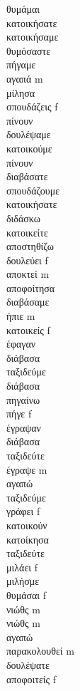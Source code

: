 θυμάμαι  \\ 
κατοικήσατε  \\ 
κατοικήσαμε  \\ 
θυμόσαστε  \\ 
πήγαμε  \\ 
αγαπά m \\ 
μίλησα  \\ 
σπουδάζεις f \\ 
πίνουν  \\ 
δουλέψαμε  \\ 
κατοικούμε  \\ 
πίνουν  \\ 
διαβάσατε  \\ 
σπουδάζουμε  \\ 
κατοικήσατε  \\ 
διδάσκω  \\ 
κατοικείτε  \\ 
αποστηθίζω  \\ 
δουλεύει f \\ 
αποκτεί m \\ 
αποφοίτησα  \\ 
διαβάσαμε  \\ 
ήπιε m \\ 
κατοικείς f \\ 
έφαγαν  \\ 
διάβασα  \\ 
ταξιδεύμε  \\ 
διάβασα  \\ 
πηγαίνω  \\ 
πήγε f \\ 
έγραψαν  \\ 
διάβασα  \\ 
ταξιδεύτε  \\ 
έγραψε m \\ 
αγαπώ  \\ 
ταξιδεύμε  \\ 
γράφει f \\ 
κατοικούν  \\ 
κατοίκησα  \\ 
ταξιδεύτε  \\ 
μιλάει f \\ 
μιλήσμε  \\ 
θυμάσαι f \\ 
νιώθς m \\ 
νιώθς m \\ 
αγαπώ  \\ 
παρακολουθεί m \\ 
δουλέψατε  \\ 
αποφοιτείς f \\ 
